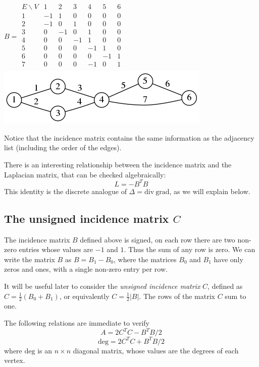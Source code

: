 $
B =
\begin{array}{l|lllllll}
	E\backslash V
	  & 1 & 2 & 3 & 4 & 5 & 6 \\
	\hline
	1 &-1 & 1 & 0 & 0 & 0 & 0 \\
	2 &-1 & 0 & 1 & 0 & 0 & 0 \\
	3 & 0 &-1 & 0 & 1 & 0 & 0 \\
	4 & 0 & 0 &-1 & 1 & 0 & 0 \\
	5 & 0 & 0 & 0 &-1 & 1 & 0 \\
	6 & 0 & 0 & 0 & 0 &-1 & 1 \\
	7 & 0 & 0 & 0 &-1 & 0 & 1 \\
\end{array}
$
\includegraphics{graph2.png}



Notice that the incidence matrix contains the same information as the
adjacency list (including the order of the edges).



There is an interesting relationship between the incidence matrix and the
Laplacian matrix, that can be checked algebraically:
\[
L = -B^TB
\]
This identity is the discrete analogue of $\Delta=\mathrm{div\ grad}$,
as we will explain below.



\subsection{The unsigned incidence matrix $C$}


The incidence matrix $B$ defined above is signed, on each row there are two
non-zero entries whose values are $-1$ and $1$.  Thus the sum of any row is
zero.
We can write the matrix $B$ as $B=B_1-B_0$, where the matrices
$B_0$ and $B_1$ have only zeros and ones, with a single non-zero entry per
row.



It will be useful later to consider the \emph{unsigned incidence matrix}
$C$, defined as $C=\frac{1}{2}(B_0 + B_1)$, or equivalently
$C=\frac{1}{2}|B|$.  The rows of the matrix $C$ sum to one.



The following relations are immediate to verify
\[
A = 2C^TC-B^TB/2
\]
\[
\mathrm{deg} = 2C^TC+B^TB/2
\]
where $\mathrm{deg}$ is an $n\times n$ diagonal matrix, whose values are the
degrees of each vertex.



